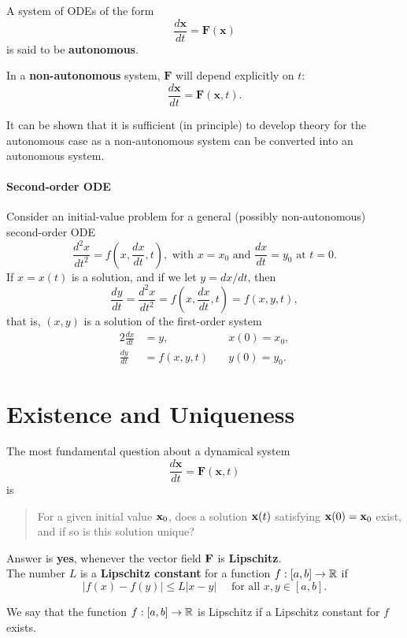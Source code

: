 A system of ODEs of the form
\[\frac{d\mathbf{x}}{dt} = \mathbf{F}(\mathbf{x})\]
is said to be \textbf{autonomous}.

In a \textbf{non-autonomous} system, \(\mathbf{F}\) will depend explicitly on \(t\):
\[\frac{d\mathbf{x}}{dt} = \mathbf{F}(\mathbf{x}, t).\]

It can be shown that it is sufficient (in principle) to develop theory for the autonomous case as a non-autonomous system can be converted into an autonomous system.

\paragraph{Second-order ODE}
Consider an initial-value problem for a general (possibly non-autonomous) second-order ODE
\[\frac{d^2 x}{dt^2} = f\left(x, \frac{dx}{dt}, t \right), \text{ with } x= x_0 \text{ and } \frac{dx}{dt} = y_0 \text{ at } t= 0.\]
If \(x = x(t)\) is a solution, and if we let \(y = dx/dt\), then
\[\frac{dy}{dt} = \frac{d^2x}{dt^2} = f\left(x, \frac{dx}{dt}, t \right) = f(x, y, t),\]
that is, \((x, y)\) is a solution of the first-order system
\begin{alignat*}{2}
    \frac{dx}{dt} & = y,         & \quad x(0) = x_0, \\
    \frac{dy}{dt} & = f(x, y, t) & \quad y(0) = y_0.
\end{alignat*}


\section{Existence and Uniqueness}
The most fundamental question about a dynamical system
\[\frac{d\mathbf{x}}{dt} = \mathbf{F}(\mathbf{x}, t)\]
is
\begin{quote}
    For a given initial value \(\mathbf{x}_0\), does a solution \(\mathbf{x}(t)\) satisfying \(\mathbf{x}(0) = \mathbf{x}_0\) exist, and if so is this solution unique?
\end{quote}
Answer is \textbf{yes}, whenever the vector field \(\mathbf{F}\) is \textbf{Lipschitz}. \\

The number \(L\) is a \textbf{Lipschitz constant} for a function \(f: [a, b] \to \mathbb{R}\) if
\[|f(x) - f(y)| \leq L|x - y| \quad \text{ for all } x,y \in [a, b].\]

\bigskip
We say that the function \(f: [a, b] \to \mathbb{R}\) is Lipschitz if a Lipschitz constant for \(f\) exists.

